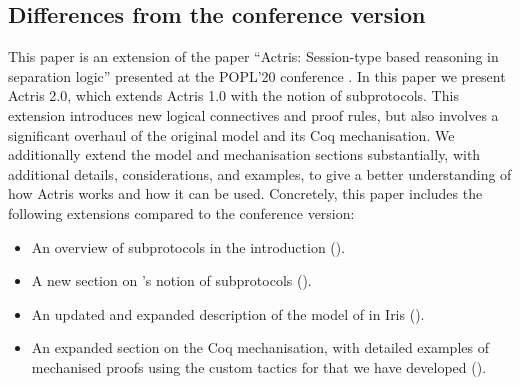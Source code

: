 \subsection{Differences from the conference version}

This paper is an extension of the paper
``Actris: Session-type based reasoning in separation logic'' presented at
the POPL'20 conference \cite{DBLP:journals/pacmpl/HinrichsenBK20}.
In this paper we present Actris 2.0, which extends Actris 1.0 with the notion of
subprotocols.
This extension introduces new logical connectives and proof rules, but also
involves a significant overhaul of the original model and
its Coq mechanisation.
We additionally extend the model and mechanisation sections substantially,
with additional details, considerations, and examples, to give a better
understanding of how Actris works and how it can be used.
Concretely, this paper includes the following extensions compared to the
conference version:

\begin{itemize}
\item An overview of subprotocols in the introduction ().
\item A new section on 's notion of subprotocols
  ().
\item An updated and expanded description of the model of \lname in
  Iris ().
\item An expanded section on the Coq mechanisation, with detailed examples of mechanised
  proofs using the custom tactics for \lname that we have developed ().
\end{itemize}
